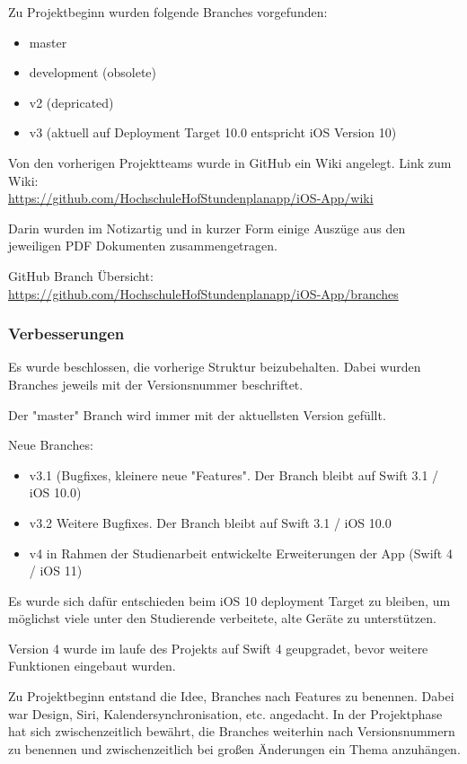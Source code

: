 Zu Projektbeginn wurden folgende Branches vorgefunden:
\begin{itemize}
\item master
\item development (obsolete)
\item v2 (depricated)
\item v3 (aktuell auf Deployment Target 10.0 entspricht iOS Version 10)
\end{itemize}


Von den vorherigen Projektteams wurde in GitHub ein Wiki angelegt.
Link zum Wiki:\\
\url{https://github.com/HochschuleHofStundenplanapp/iOS-App/wiki}

Darin wurden im Notizartig und in kurzer Form einige Auszüge aus den jeweiligen PDF Dokumenten zusammengetragen.




GitHub Branch Übersicht:\\
 \url{https://github.com/HochschuleHofStundenplanapp/iOS-App/branches}

\subsubsection{Verbesserungen}
Es wurde beschlossen, die vorherige Struktur beizubehalten. Dabei wurden Branches jeweils mit der Versionsnummer beschriftet.

Der "master" Branch wird immer mit der aktuellsten Version gefüllt.

Neue Branches:
\begin{itemize}
\item v3.1 (Bugfixes, kleinere neue "Features". Der Branch bleibt auf Swift 3.1  / iOS 10.0)
\item v3.2 Weitere Bugfixes. Der Branch bleibt auf Swift 3.1  / iOS 10.0 %
\item v4 in Rahmen der Studienarbeit entwickelte Erweiterungen der App (Swift 4 / iOS 11)
\end{itemize}




Es wurde sich dafür entschieden beim iOS 10 deployment Target zu bleiben, um möglichst viele unter den Studierende verbeitete, alte Geräte zu unterstützen.

Version 4 wurde im laufe des Projekts auf Swift 4 geupgradet, bevor weitere Funktionen eingebaut wurden.

Zu Projektbeginn entstand die Idee, Branches nach Features zu benennen. Dabei war Design, Siri, Kalendersynchronisation, etc. angedacht. In der Projektphase hat sich zwischenzeitlich bewährt, die Branches weiterhin nach Versionsnummern zu benennen und zwischenzeitlich bei großen Änderungen ein Thema anzuhängen.




